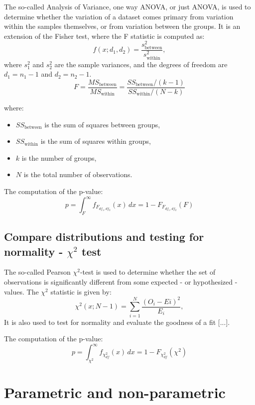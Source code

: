 \documentclass{book}
\begin{document}
The so-called Analysis of Variance, one way ANOVA, or just ANOVA, is used to determine whether the variation of a dataset comes primary from variation within the samples themselves, or from variation between the groups. It is an extension of the Fisher test, where the F statistic is computed as:
\[
    f(x; d_{1}, d_{2}) = \frac{s_\text{between}^{2}}{s_\text{within}^{2}},
\]
where $s_1^{2}$ and $s_2^{2}$ are the sample variances, and the degrees of freedom are $d_1 = n_1 - 1$ and $d_2 = n_2 - 1$.\\


\[
F = \frac{MS_{\text{between}}}{MS_{\text{within}}} = \frac{SS_{\text{between}} / (k - 1)}{SS_{\text{within}} / (N - k)}
\]

where:
\begin{itemize}
  \item $SS_{\text{between}}$ is the sum of squares between groups,
  \item $SS_{\text{within}}$ is the sum of squares within groups,
  \item $k$ is the number of groups,
  \item $N$ is the total number of observations.
\end{itemize}


The computation of the p-value:
\[
p = \int_{F}^{\infty} f_{F_{df_1, df_2}}(x)\,dx = 1 - F_{F_{df_1, df_2}}(F)
\]


\newpage

\subsection{Compare distributions and testing for normality - $\chi^{2}$ test}

The so-called Pearson $\chi^{2}$-test is used to determine whether the set of observations is significantly different from some expected - or hypothesized - values. The $\chi^{2}$ statistic is given by:
\[
    \chi^{2}(x; N - 1) = \sum_{i = 1}^{N}\frac{(O_{i} - E{i})^{2}}{E_i},
\]
It is also used to test for normality and evaluate the goodness of a fit [...].

The computation of the p-value:
\[
p = \int_{\chi^2}^{\infty} f_{\chi^2_{df}}(x)\,dx = 1 - F_{\chi^2_{df}}(\chi^2)
\]

\newpage

\section{Parametric and non-parametric}
\end{document}
